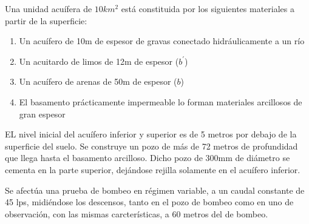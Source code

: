 \begin{example}
    Una unidad acuífera de $10km^2$ está constituida por los siguientes materiales a partir de la superficie:
    \begin{enumerate}
        \item Un acuífero de 10m de espesor de gravas conectado hidráulicamente a un río
        \item Un acuitardo de limos de 12m de espesor ($b^{\prime}$)
        \item Un acuífero de arenas de 50m de espesor ($b$)
        \item El basamento prácticamente impermeable lo forman materiales arcillosos de gran espesor
    \end{enumerate}
EL nivel inicial del acuífero inferior y superior es de 5 metros por debajo de la superficie del suelo. Se construye un pozo de más de 72 metros de profundidad que llega hasta el basamento arcilloso. Dicho pozo de 300mm de diámetro se cementa en la parte superior, dejándose rejilla solamente en el acuífero inferior.

Se afectúa una prueba de bombeo en régimen variable, a un caudal constante de 45 lps, midiéndose los descensos, tanto en el pozo de bombeo como en uno de observación, con las mismas carcterísticas, a 60 metros del de bombeo.


\end{example}

